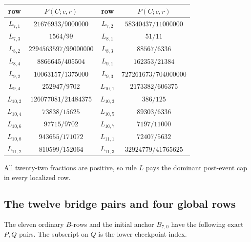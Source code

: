 \documentclass[11pt]{article}
\begin{document}
\begin{center}
\small
\renewcommand{\arraystretch}{1.12}
\begin{tabular}{@{}c c@{\qquad}c c@{}}
\toprule
row&\(P(C;c,r)\)&row&\(P(C;c,r)\)\\
\midrule
\(L_{7,1}\)&\(21676933/9000000\)&\(L_{7,2}\)&\(58340437/11000000\)\\
\(L_{7,3}\)&\(1564/99\)&\(L_{8,1}\)&\(51/11\)\\
\(L_{8,2}\)&\(2294563597/99000000\)&\(L_{8,3}\)&\(88567/6336\)\\
\(L_{8,4}\)&\(8866645/405504\)&\(L_{9,1}\)&\(162353/21384\)\\
\(L_{9,2}\)&\(10063157/1375000\)&\(L_{9,3}\)&\(727261673/704000000\)\\
\(L_{9,4}\)&\(252947/9702\)&\(L_{10,1}\)&\(2173382/606375\)\\
\(L_{10,2}\)&\(126077081/21484375\)&\(L_{10,3}\)&\(386/125\)\\
\(L_{10,4}\)&\(73838/15625\)&\(L_{10,5}\)&\(89303/6336\)\\
\(L_{10,6}\)&\(97715/9702\)&\(L_{10,7}\)&\(7197/11000\)\\
\(L_{10,8}\)&\(943655/171072\)&\(L_{11,1}\)&\(72407/5632\)\\
\(L_{11,2}\)&\(810599/152064\)&\(L_{11,3}\)&\(32924779/41765625\)\\
\bottomrule
\end{tabular}
\end{center}
All twenty-two fractions are positive, so rule \(L\) pays the dominant
post-event cap in every localized row.

\subsection{The twelve bridge pairs and four global rows}

The eleven ordinary \(B\)-rows and the initial anchor \(B_{7,0}\) have
the following exact \(P,Q\) pairs.  The subscript on \(Q\) is the lower
checkpoint index.
\end{document}
